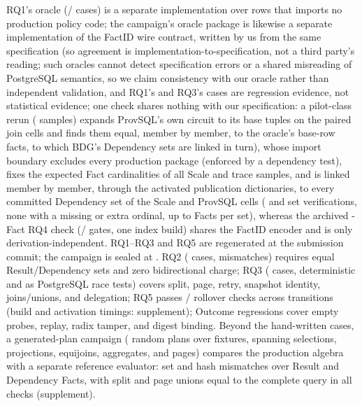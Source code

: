 \documentclass[10pt,journal,compsoc]{IEEEtran}
\begin{document}
RQ1's oracle (\RQOnePassed{}/\RQOneCases{} cases) is a separate
implementation over \RQOneRows{} rows that imports no production policy
code; the campaign's oracle package is likewise a separate implementation
of the FactID wire contract, written by us from the same specification (so
agreement is implementation-to-specification, not a third party's reading;
such oracles cannot detect specification errors or a shared misreading of
PostgreSQL semantics, so we claim consistency with our oracle rather than
independent validation, and RQ1's \RQOneCases{} and RQ3's \RQThreeCases{}
cases are regression evidence, not statistical evidence; one check shares
nothing with our specification: a pilot-class rerun
(\FinalVFiveProvSQLLeafSamples{} samples) expands ProvSQL's own
circuit to its base tuples on the paired join cells and finds them equal,
member by member, to the oracle's \FinalVFiveProvSQLLeafTotalRowFacts{}
base-row facts, to which BDG's Dependency sets are linked in turn),
whose import boundary excludes
every production package (enforced by a dependency test), fixes the
expected Fact cardinalities of all
\FinalVFivePublicationIndependentOracleSamples{} Scale and trace samples,
and is linked member by member, through the activated publication
dictionaries, to every committed Dependency set of the Scale and ProvSQL
cells (\FinalVFivePublicationScaleDependencyLinksVerified{} and
\FinalVFivePublicationProvSQLDependencyLinksVerified{} set verifications,
none with a missing or extra ordinal, up to
\FinalVFivePublicationScaleDependencyLinkMaxFacts{} Facts per set), whereas
the archived \RQFourVFourOracleFacts{}-Fact RQ4 check
(\RQFourVFourGatesPassed{}/\RQFourVFourGatesTotal{} gates, one index build)
shares the FactID encoder and is only derivation-independent. RQ1--RQ3
and RQ5 are regenerated at the submission commit; the campaign is sealed at
\FinalVFivePublicationCommit{}. RQ2
(\RQTwoExposureCases{} cases, \RQTwoExposureMismatches{} mismatches)
requires equal Result/Dependency sets and zero bidirectional charge; RQ3
(\RQThreeCases{} cases, deterministic and as PostgreSQL race tests) covers
split, page, retry, snapshot identity, joins/unions, and delegation;
RQ5 passes \RQFiveChecksPassed{}/\RQFiveChecksTotal{} rollover checks
across \RQFiveTransitions{} transitions (build and activation timings:
supplement); Outcome
regressions cover empty
probes, replay, radix tamper, and digest binding. Beyond the hand-written
cases, a generated-plan campaign (\GeneratedPlans{} random plans over
\GeneratedFixtures{} fixtures, spanning selections, projections,
equijoins, aggregates, and pages) compares the production algebra with a
separate reference evaluator: \GeneratedMismatches{} set and
\GeneratedHashMismatches{} hash mismatches over \GeneratedReleaseFacts{}
Result and \GeneratedDependencyFacts{} Dependency Facts, with split and
page unions equal to the complete query in all \GeneratedSplitChecks{}
checks (supplement).
\end{document}
